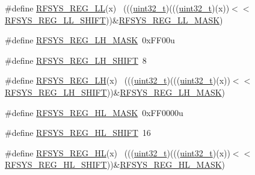 \begin{DoxyCompactItemize}
\item 
\#define \hyperlink{group___r_f_s_y_s___register___masks_ga605e2a9b11854ce01ce33ab06ee481ab}{R\+F\+S\+Y\+S\+\_\+\+R\+E\+G\+\_\+\+LL}(x)                                                ~(((\hyperlink{_p_e___types_8h_a33594304e786b158f3fb30289278f5af}{uint32\+\_\+t})(((\hyperlink{_p_e___types_8h_a33594304e786b158f3fb30289278f5af}{uint32\+\_\+t})(x))$<$$<$\hyperlink{group___r_f_s_y_s___register___masks_gaab45c60c0a8e5edb59537ee2bcb2bbcf}{R\+F\+S\+Y\+S\+\_\+\+R\+E\+G\+\_\+\+L\+L\+\_\+\+S\+H\+I\+FT}))\&\hyperlink{group___r_f_s_y_s___register___masks_ga2fe64579aaef18ce266e3d6c316d3241}{R\+F\+S\+Y\+S\+\_\+\+R\+E\+G\+\_\+\+L\+L\+\_\+\+M\+A\+SK})
\item 
\#define \hyperlink{group___r_f_s_y_s___register___masks_ga9f8ddcb45324c34fd2d19417b8b13d11}{R\+F\+S\+Y\+S\+\_\+\+R\+E\+G\+\_\+\+L\+H\+\_\+\+M\+A\+SK}~0x\+F\+F00u
\item 
\#define \hyperlink{group___r_f_s_y_s___register___masks_gabe96c857aab7668805c1fb3ea46693bf}{R\+F\+S\+Y\+S\+\_\+\+R\+E\+G\+\_\+\+L\+H\+\_\+\+S\+H\+I\+FT}~8
\item 
\#define \hyperlink{group___r_f_s_y_s___register___masks_ga9e5f30d82693f4f97b51b6459c3dc590}{R\+F\+S\+Y\+S\+\_\+\+R\+E\+G\+\_\+\+LH}(x)                                                ~(((\hyperlink{_p_e___types_8h_a33594304e786b158f3fb30289278f5af}{uint32\+\_\+t})(((\hyperlink{_p_e___types_8h_a33594304e786b158f3fb30289278f5af}{uint32\+\_\+t})(x))$<$$<$\hyperlink{group___r_f_s_y_s___register___masks_gabe96c857aab7668805c1fb3ea46693bf}{R\+F\+S\+Y\+S\+\_\+\+R\+E\+G\+\_\+\+L\+H\+\_\+\+S\+H\+I\+FT}))\&\hyperlink{group___r_f_s_y_s___register___masks_ga9f8ddcb45324c34fd2d19417b8b13d11}{R\+F\+S\+Y\+S\+\_\+\+R\+E\+G\+\_\+\+L\+H\+\_\+\+M\+A\+SK})
\item 
\#define \hyperlink{group___r_f_s_y_s___register___masks_ga063f595b6c7267627c96048590611cc1}{R\+F\+S\+Y\+S\+\_\+\+R\+E\+G\+\_\+\+H\+L\+\_\+\+M\+A\+SK}~0x\+F\+F0000u
\item 
\#define \hyperlink{group___r_f_s_y_s___register___masks_gabc34a2d1963a697d1a773a8981a063f5}{R\+F\+S\+Y\+S\+\_\+\+R\+E\+G\+\_\+\+H\+L\+\_\+\+S\+H\+I\+FT}~16
\item 
\#define \hyperlink{group___r_f_s_y_s___register___masks_ga2181a8fe6350e129761edcd07b9be025}{R\+F\+S\+Y\+S\+\_\+\+R\+E\+G\+\_\+\+HL}(x)                                                ~(((\hyperlink{_p_e___types_8h_a33594304e786b158f3fb30289278f5af}{uint32\+\_\+t})(((\hyperlink{_p_e___types_8h_a33594304e786b158f3fb30289278f5af}{uint32\+\_\+t})(x))$<$$<$\hyperlink{group___r_f_s_y_s___register___masks_gabc34a2d1963a697d1a773a8981a063f5}{R\+F\+S\+Y\+S\+\_\+\+R\+E\+G\+\_\+\+H\+L\+\_\+\+S\+H\+I\+FT}))\&\hyperlink{group___r_f_s_y_s___register___masks_ga063f595b6c7267627c96048590611cc1}{R\+F\+S\+Y\+S\+\_\+\+R\+E\+G\+\_\+\+H\+L\+\_\+\+M\+A\+SK})
$$
\end{DoxyCompactItemize}
